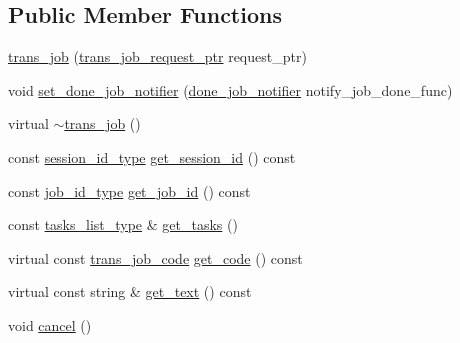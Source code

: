 \subsection*{Public Member Functions}
\begin{DoxyCompactItemize}
\item 
\hyperlink{classuva_1_1smt_1_1bpbd_1_1server_1_1trans__job_ace017f21aff5f23a9844767c7ec69503}{trans\+\_\+job} (\hyperlink{namespaceuva_1_1smt_1_1bpbd_1_1common_1_1messaging_af373ab262c0cab837c6ebe5e2eb62ea2}{trans\+\_\+job\+\_\+request\+\_\+ptr} request\+\_\+ptr)
\item 
void \hyperlink{classuva_1_1smt_1_1bpbd_1_1server_1_1trans__job_aaafc88ae2a94e07d4cab671006a9212a}{set\+\_\+done\+\_\+job\+\_\+notifier} (\hyperlink{classuva_1_1smt_1_1bpbd_1_1server_1_1trans__job_ad136e2791c7f5259a4e0974db72e7178}{done\+\_\+job\+\_\+notifier} notify\+\_\+job\+\_\+done\+\_\+func)
\item 
virtual \hyperlink{classuva_1_1smt_1_1bpbd_1_1server_1_1trans__job_a4cea7e8ebd0017b12736ef55753f302a}{$\sim$trans\+\_\+job} ()
\item 
const \hyperlink{namespaceuva_1_1smt_1_1bpbd_1_1common_1_1messaging_a17ad17f94b78abb87ab5f3f3d6f09588}{session\+\_\+id\+\_\+type} \hyperlink{classuva_1_1smt_1_1bpbd_1_1server_1_1trans__job_a0aaaf0f114b4c8e1f9816050ced3b1ae}{get\+\_\+session\+\_\+id} () const 
\item 
const \hyperlink{namespaceuva_1_1smt_1_1bpbd_1_1common_1_1messaging_af12d41e7490214ac057969e9d4af1436}{job\+\_\+id\+\_\+type} \hyperlink{classuva_1_1smt_1_1bpbd_1_1server_1_1trans__job_af6a0ebbf7f5a1090174afb826780778f}{get\+\_\+job\+\_\+id} () const 
\item 
const \hyperlink{classuva_1_1smt_1_1bpbd_1_1server_1_1trans__job_a8d6020c8c7d17ba4bbb71fd85df6791d}{tasks\+\_\+list\+\_\+type} \& \hyperlink{classuva_1_1smt_1_1bpbd_1_1server_1_1trans__job_a2370b9540596de89088097b4ef6a2129}{get\+\_\+tasks} ()
\item 
virtual const \hyperlink{classuva_1_1smt_1_1bpbd_1_1common_1_1messaging_1_1trans__job__code}{trans\+\_\+job\+\_\+code} \hyperlink{classuva_1_1smt_1_1bpbd_1_1server_1_1trans__job_a2d0377b9dfa3ef4f181c922eeb0e004c}{get\+\_\+code} () const 
\item 
virtual const string \& \hyperlink{classuva_1_1smt_1_1bpbd_1_1server_1_1trans__job_a71d1c9bffeba77eb3914a618fba384bb}{get\+\_\+text} () const 
\item 
void \hyperlink{classuva_1_1smt_1_1bpbd_1_1server_1_1trans__job_a285349f1d0300e617b7ac14b6894c9fe}{cancel} ()
\end{DoxyCompactItemize}
